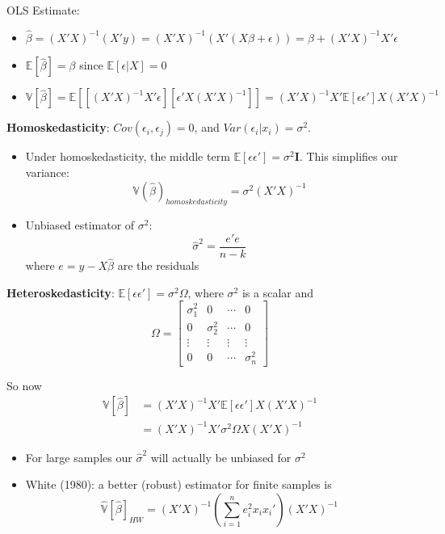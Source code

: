 \begin{frame}
OLS Estimate:
\begin{itemize}
    \item $\hat{\beta}=(X'X)^{-1}(X'y) = (X'X)^{-1}(X'(X\beta+\epsilon)) = \beta + (X'X)^{-1}X'\epsilon$
    \item $\mathbb{E}[\hat{\beta}] = \beta$ since $\mathbb{E}[\epsilon|X]=0$
    \item $\mathbb{V}[\hat{\beta}] = \mathbb{E}[[(X'X)^{-1}X'\epsilon][\epsilon'X(X'X)^{-1}]]=(X'X)^{-1}X'\mathbb{E}[\epsilon\epsilon']X(X'X)^{-1}$
\end{itemize}

\textbf{Homoskedasticity}:
$Cov(\epsilon_{i},\epsilon_{j})=0$, and $Var(\epsilon_{i}|x_{i})=\sigma^{2}$.


\begin{itemize}
    \item Under homoskedasticity, the middle term $\mathbb{E}[\epsilon\epsilon']=\sigma^{2} \mathbf{I}$. This simplifies our variance: $$\mathbb{V}(\hat{\beta})_{homoskedasticity}=\sigma^{2}(X'X)^{-1}$$
  \item Unbiased estimator of $\sigma^2$:
    $$
        \hat{\sigma}^2 = \frac{e'e}{n-k}
    $$
    where $e = y - X\hat{\beta}$ are the residuals

\end{itemize}
\end{frame}

\begin{frame}
\textbf{Heteroskedasticity}: $\mathbb{E}[\epsilon\epsilon'] = \sigma^2\Omega$, where $\sigma^2$ is a scalar and
$$
    \Omega = \begin{bmatrix}
        \sigma_1^2 & 0 & \cdots & 0 \\
        0 & \sigma_2^2 & \cdots & 0 \\
        \vdots & \vdots & \vdots & \vdots \\
        0 & 0 & \cdots & \sigma_n^2
    \end{bmatrix}
$$

So now
\begin{align*}
    \mathbb{V}[\hat{\beta}] &= (X'X)^{-1}X'\mathbb{E}[\epsilon\epsilon']X(X'X)^{-1}\\
    &= (X'X)^{-1}X'\sigma^2\Omega X(X'X)^{-1}    
\end{align*}

\begin{itemize}
    \item For large samples our $\hat{\sigma}^2$ will actually be unbiased for $\sigma^2$
    \item White (1980): a better (robust) estimator for finite samples is
    $$
        \hat{\mathbb{V}}[\hat{\beta}]_{HW} = (X'X)^{-1}\left(\sum_{i=1}^n e_i^2 x_i x_i'\right) (X'X)^{-1}
    $$
\end{itemize}
\end{frame}

